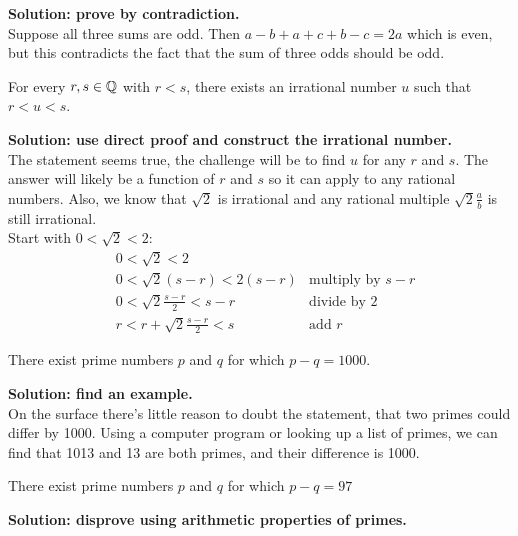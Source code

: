 \documentclass{article}
\begin{document}
\textbf{Solution: prove by contradiction.}
\\

Suppose all three sums are odd. Then $a - b + a + c + b - c = 2a$ which is even, but this contradicts the fact that the sum of three odds should be odd.

\begin{problem}
For every $r, s \in\mathbb{Q}$ with $r < s$, there exists an irrational number $u$ such that $r < u < s$.
\end{problem}

\textbf{Solution: use direct proof and construct the irrational number.}
\\

The statement seems true, the challenge will be to find $u$ for any $r$ and $s$. The answer will likely be a function of $r$ and $s$ so it can apply to any rational numbers. Also, we know that $\sqrt{2}$ is irrational and any rational multiple $\sqrt{2}\frac{a}{b}$ is still irrational.
\\

Start with $0 < \sqrt{2} < 2$:
\begin{align*}
     & 0 < \sqrt{2} < 2                  &                          \\
     & 0 < \sqrt{2}(s-r) < 2(s-r)        & \text{multiply by $s-r$} \\
     & 0 < \sqrt{2}\frac{s-r}{2} < s-r   & \text{divide by 2}       \\
     & r < r + \sqrt{2}\frac{s-r}{2} < s & \text{add $r$}
\end{align*}

\begin{problem}
There exist prime numbers $p$ and $q$ for which $p - q = 1000$.
\end{problem}

\textbf{Solution: find an example.}
\\

On the surface there's little reason to doubt the statement, that two primes could differ by 1000. Using a computer program or looking up a list of primes, we can find that 1013 and 13 are both primes, and their difference is 1000.

\begin{problem}
There exist prime numbers $p$ and $q$ for which $p - q = 97$
\end{problem}

\textbf{Solution: disprove using arithmetic properties of primes.}
\\
\end{document}
